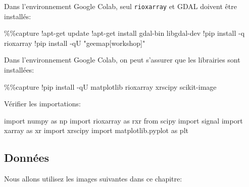\documentclass[
  11pt,
  letterpaper,
  open=any,
  twoside=false,
  french]{scrbook}
\newenvironment{Shaded}{\begin{snugshade}}{\end{snugshade}}
\newcommand{\BuiltInTok}[1]{\textcolor[rgb]{0.00,0.23,0.31}{#1}}
\newcommand{\ImportTok}[1]{\textcolor[rgb]{0.00,0.46,0.62}{#1}}
\newcommand{\NormalTok}[1]{\textcolor[rgb]{0.00,0.23,0.31}{#1}}
\newcommand{\OperatorTok}[1]{\textcolor[rgb]{0.37,0.37,0.37}{#1}}
\newcommand{\StringTok}[1]{\textcolor[rgb]{0.13,0.47,0.30}{#1}}
\begin{document}
Dans l'environnement Google Colab, seul \texttt{rioxarray} et GDAL
doivent être installés:

\begin{Shaded}
\begin{Highlighting}[]
\OperatorTok{\%\%}\NormalTok{capture}
\OperatorTok{!}\NormalTok{apt}\OperatorTok{{-}}\NormalTok{get update}
\OperatorTok{!}\NormalTok{apt}\OperatorTok{{-}}\NormalTok{get install gdal}\OperatorTok{{-}}\BuiltInTok{bin}\NormalTok{ libgdal}\OperatorTok{{-}}\NormalTok{dev}
\OperatorTok{!}\NormalTok{pip install }\OperatorTok{{-}}\NormalTok{q rioxarray}
\OperatorTok{!}\NormalTok{pip install }\OperatorTok{{-}}\NormalTok{qU }\StringTok{"geemap[workshop]"}
\end{Highlighting}
\end{Shaded}

Dans l'environnement Google Colab, on peut s'assurer que les librairies
sont installées:

\begin{Shaded}
\begin{Highlighting}[]
\OperatorTok{\%\%}\NormalTok{capture}
\OperatorTok{!}\NormalTok{pip install }\OperatorTok{{-}}\NormalTok{qU matplotlib rioxarray xrscipy scikit}\OperatorTok{{-}}\NormalTok{image}
\end{Highlighting}
\end{Shaded}

Vérifier les importations:

\begin{Shaded}
\begin{Highlighting}[]
\ImportTok{import}\NormalTok{ numpy }\ImportTok{as}\NormalTok{ np}
\ImportTok{import}\NormalTok{ rioxarray }\ImportTok{as}\NormalTok{ rxr}
\ImportTok{from}\NormalTok{ scipy }\ImportTok{import}\NormalTok{ signal}
\ImportTok{import}\NormalTok{ xarray }\ImportTok{as}\NormalTok{ xr}
\ImportTok{import}\NormalTok{ xrscipy}
\ImportTok{import}\NormalTok{ matplotlib.pyplot }\ImportTok{as}\NormalTok{ plt}
\end{Highlighting}
\end{Shaded}

\subsection{Données}\label{donnuxe9es-1}

Nous allons utilisez les images suivantes dans ce chapitre:
\end{document}
